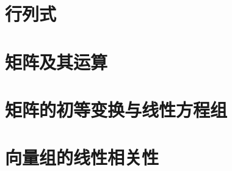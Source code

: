 \documentclass{article}
\begin{document}
  \tableofcontents

  \newpage
  \section{行列式}
    
  \section{矩阵及其运算}
    
  \section{矩阵的初等变换与线性方程组}
    
  \section{向量组的线性相关性}
    
\end{document}
